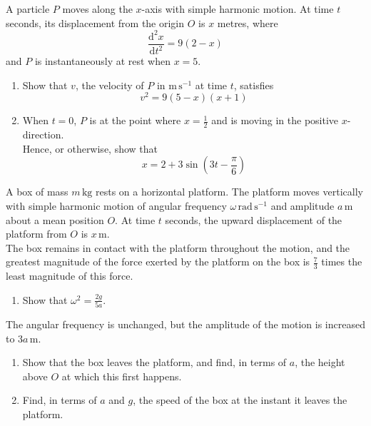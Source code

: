 \documentclass[leqno]{article}
\begin{document}
\begin{enumerate}[
  label=\textbf{\arabic*.},
  leftmargin=*,
  topsep=0pt,
  partopsep=0pt,
  parsep=0pt
]
\newpage

\questionitem

A particle $P$ moves along the $x$-axis with simple harmonic motion. At time $t$ seconds, its displacement from the origin $O$ is $x$ metres, where
\[
\frac{\mathrm{d}^2x}{\mathrm{d}t^2}=9(2-x)
\]
and $P$ is instantaneously at rest when $x=5$. \\
\begin{enumerate}[label=\textbf{(\alph*)}]
\item Show that $v$, the velocity of $P$ in $\mathrm{m\,s^{-1}}$ at time $t$, satisfies
\[
v^2=9(5-x)(x+1)
\]
\item When $t=0$, $P$ is at the point where $x=\frac{1}{2}$ and is moving in the positive $x$-direction. \\
Hence, or otherwise, show that
\[
x=2+3\sin\left(3t-\frac{\pi}{6}\right)
\]
\end{enumerate}

\newpage

\questionitem

A box of mass $m\,\mathrm{kg}$ rests on a horizontal platform. The platform moves vertically with simple harmonic motion of angular frequency $\omega\,\mathrm{rad\,s^{-1}}$ and amplitude $a\,\mathrm{m}$ about a mean position $O$. At time $t$ seconds, the upward displacement of the platform from $O$ is $x\,\mathrm{m}$. \\
The box remains in contact with the platform throughout the motion, and the greatest magnitude of the force exerted by the platform on the box is $\frac{7}{3}$ times the least magnitude of this force. \\
\begin{enumerate}[label=\textbf{(\alph*)}]
\item Show that $\omega^2=\frac{2g}{5a}$.  \\
\end{enumerate}
The angular frequency is unchanged, but the amplitude of the motion is increased to $3a\,\mathrm{m}$. \\
\begin{enumerate}[label=\textbf{(\alph*)}, resume]
\item Show that the box leaves the platform, and find, in terms of $a$, the height above $O$ at which this first happens.  \\
\item Find, in terms of $a$ and $g$, the speed of the box at the instant it leaves the platform.  \\
\end{enumerate}


\end{enumerate}
\end{document}
